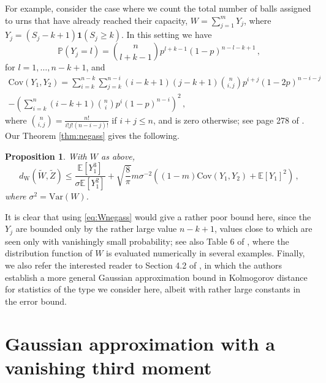 \documentclass[12pt]{article}
\newtheorem{proposition}[theorem]{Proposition}
\begin{document}
For example, consider the case where we count the total number of balls assigned to urns that have already reached their capacity, $W=\sum_{j=1}^mY_j$, where $Y_j=(S_j-k+1)\mathbf{1}(S_j\geq k)$. In this setting we have 
\[
\mathbb{P}(Y_j=l)=\binom{n}{l+k-1}p^{l+k-1}(1-p)^{n-l-k+1}\,,
\]
for $l=1,\ldots,n-k+1$, and
\begin{multline*}
\text{Cov}(Y_1,Y_2)=\sum_{i=k}^{n-k}\sum_{j=k}^{n-i}(i-k+1)(j-k+1)\binom{n}{i,j}p^{i+j}(1-2p)^{n-i-j}\\
-\left(\sum_{i=k}^n(i-k+1)\binom{n}{i}p^i(1-p)^{n-i}\right)^2\,,
\end{multline*}
where $\binom{n}{i,j}=\frac{n!}{i!j!(n-i-j)!}$ if $i+j\leq n$, and is zero otherwise; see page 278 of \cite{boutsikas02b}. Our Theorem \ref{thm:negass} gives the following.
\begin{proposition}
With $W$ as above,
\[
d_\text{W}(\widetilde{W},\widetilde{Z})\leq\frac{\mathbb{E}[Y_1^3]}{\sigma\mathbb{E}[Y_1^2]}+\sqrt{\frac{8}{\pi}}m\sigma^{-2}\left((1-m)\text{Cov}(Y_1,Y_2)+\mathbb{E}[Y_1]^2\right)\,,
\]
where $\sigma^2=\text{Var}(W)$. 
\end{proposition}
It is clear that using \eqref{eq:Wnegass} would  give a rather poor bound here, since the $Y_j$ are bounded only by the rather large value $n-k+1$, values close to which are seen only with vanishingly small probability; see also Table 6 of \cite{boutsikas02b}, where the distribution function of $W$ is evaluated numerically in several examples. Finally, we also refer the interested reader to Section 4.2 of \cite{chen10}, in which the authors establish a more general Gaussian approximation bound in Kolmogorov distance for statistics of the type we consider here, albeit with rather large constants in the error bound.

\section{Gaussian approximation with a vanishing third moment}\label{sec:ThirdMom}
\end{document}
